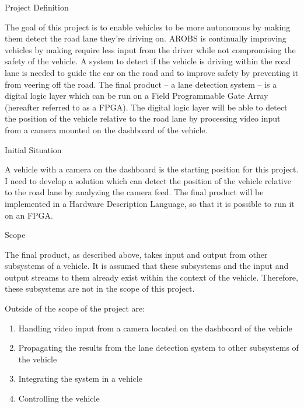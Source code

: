 \documentclass{matthijs}
\begin{document}
	\begin{hoofdstuk}{Project Definition}

		The goal of this project is to enable vehicles to be more autonomous by making them detect the road lane they're driving on.
		AROBS is continually improving vehicles by making require less input from the driver while not compromising the safety of the vehicle.
		A system to detect if the vehicle is driving within the road lane is needed to guide the car on the road and to improve safety by preventing it from veering off the road.
		The final product -- a lane detection system -- is a digital logic layer which can be run on a Field Programmable Gate Array (hereafter referred to as a FPGA).
		The digital logic layer will be able to detect the position of the vehicle relative to the road lane by processing video input from a camera mounted on the dashboard of the vehicle.

		\begin{paragraaf}{Initial Situation}
			
			A vehicle with a camera on the dashboard is the starting position for this project.
			I need to develop a solution which can detect the position of the vehicle relative to the road lane by analyzing the camera feed.
			The final product will be implemented in a Hardware Description Language, so that it is possible to run it on an FPGA.
		
		\end{paragraaf}

		\begin{paragraaf}{Scope}

			The final product, as described above, takes input and output from other subsystems of a vehicle.
			It is assumed that these subsystems and the input and output streams to them already exist within the context of the vehicle.
			Therefore, these subsystems are not in the scope of this project.
			
			Outside of the scope of the project are:

			\begin{enumerate}
			
				\item Handling video input from a camera located on the dashboard of the vehicle
				\item Propagating the results from the lane detection system to other subsystems of the vehicle
				\item Integrating the system in a vehicle
				\item Controlling the vehicle
			

\end{enumerate}
\end{paragraaf}
\end{hoofdstuk}
\end{document}
